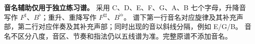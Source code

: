 \par\textbf{音名辅助仅用于独立练习谱。}
采用 C、D、E、F、G、A、B 七个字母，升降音写作 $F^{\sharp}$、$B^{\flat}$；重升、重降写作 $F^{\sharp\sharp}$、$B^{\flat\flat}$。
谱下第一行音名对应旋律及其补充声部，第二行对应伴奏及其补充声部；同时出现的音以斜线分隔，例如 E/G/B。
音名不区分八度，音区、节奏和指法仍以五线谱为准。完整原谱不添加音名。
